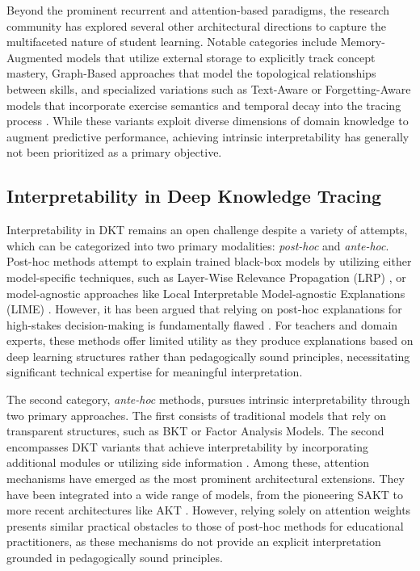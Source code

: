 \documentclass[applsci,article,submit,moreauthors,pdftex]{Definitions/mdpi}
\begin{document}
Beyond the prominent recurrent and attention-based paradigms, the research community has explored several other architectural directions to capture the multifaceted nature of student learning. Notable categories include Memory-Augmented models that utilize external storage to explicitly track concept mastery, Graph-Based approaches that model the topological relationships between skills, and specialized variations such as Text-Aware or Forgetting-Aware models that incorporate exercise semantics and temporal decay into the tracing process \citep{abdelrahman2023knowledge}. While these variants exploit diverse dimensions of domain knowledge to augment predictive performance, achieving intrinsic interpretability has generally not been prioritized as a primary objective.

\subsection{Interpretability in Deep Knowledge Tracing} \label{sec_interpretability}

Interpretability in DKT remains an open challenge despite a variety of attempts, which can be categorized into two primary modalities: \textit{post-hoc} and \textit{ante-hoc}. Post-hoc methods attempt to explain trained black-box models by utilizing either model-specific techniques, such as Layer-Wise Relevance Propagation (LRP) \citep{bach2015pixel}, or model-agnostic approaches like Local Interpretable Model-agnostic Explanations (LIME) \citep{ribeiro2016should}. However, it has been argued that relying on post-hoc explanations for high-stakes decision-making is fundamentally flawed \citep{rudin2019stop}. For teachers and domain experts, these methods offer limited utility as they produce explanations based on deep learning structures rather than pedagogically sound principles, necessitating significant technical expertise for meaningful interpretation.

The second category, \textit{ante-hoc} methods, pursues intrinsic interpretability through two primary approaches. The first consists of traditional models that rely on transparent structures, such as BKT or Factor Analysis Models. The second encompasses DKT variants that achieve interpretability by incorporating additional modules or utilizing side information \citep{bai2024survey}. Among these, attention mechanisms have emerged as the most prominent architectural extensions. They have been integrated into a wide range of models, from the pioneering SAKT \citep{Pandey2019384} to more recent architectures like AKT \citep{ghosh2020context}. However, relying solely on attention weights presents similar practical obstacles to those of post-hoc methods for educational practitioners, as these mechanisms do not provide an explicit interpretation grounded in pedagogically sound principles. 
\end{document}
